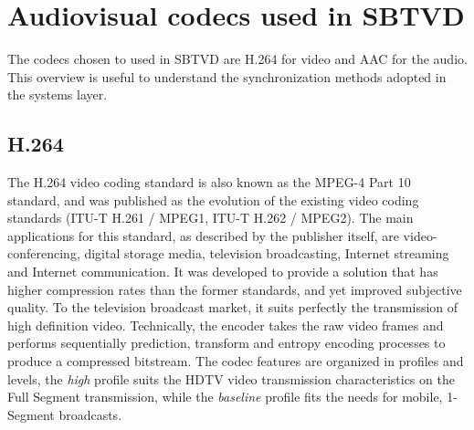 \documentclass[
	12pt,				%
	openright,			%
	twoside,			%
	a4paper,			%
	brazil,
	french,				%
	english
	]{abntex2}
\begin{document}

%



\chapter{Audiovisual codecs used in SBTVD}
\label{codecs}

The codecs chosen to used in SBTVD are H.264 for video and AAC for the audio. This overview is useful to understand the synchronization methods adopted in the systems layer.

\section{H.264}

The H.264 video coding standard is also known as the MPEG-4 Part 10 standard, and was published as the evolution of the existing video coding standards (ITU-T H.261 / MPEG1, ITU-T H.262 / MPEG2). The main applications for this standard, as described by the publisher itself, are video-conferencing, digital storage media, television broadcasting, Internet streaming and Internet communication. It was developed to provide a solution that has higher compression rates than the former standards, and yet improved subjective quality. To the television broadcast market, it suits perfectly the transmission of high definition video. Technically, the encoder takes the raw video frames and performs sequentially prediction, transform and entropy encoding processes to produce a compressed bitstream. The codec features are organized in profiles and levels, the \textit{high} profile suits the HDTV video transmission characteristics on the Full Segment transmission, while the \textit{baseline} profile fits the needs for mobile, 1-Segment broadcasts.
\end{document}
